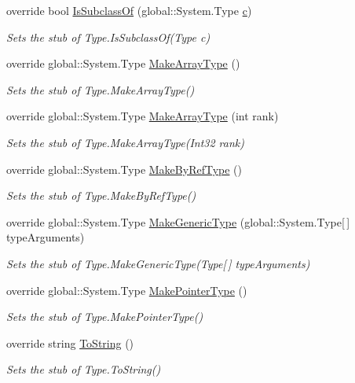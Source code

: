 \begin{DoxyCompactItemize}
override bool \hyperlink{class_system_1_1_reflection_1_1_fakes_1_1_stub_type_delegator_a7a22795f032bbaa2bbdfee06b1f17aa6}{Is\-Subclass\-Of} (global\-::\-System.\-Type \hyperlink{bootstrap_8min_8js_abce695e0af988ece0826d9ad59b8160d}{c})
\begin{DoxyCompactList}\small\item\em Sets the stub of Type.\-Is\-Subclass\-Of(\-Type c)\end{DoxyCompactList}\item 
override global\-::\-System.\-Type \hyperlink{class_system_1_1_reflection_1_1_fakes_1_1_stub_type_delegator_aba8b1e6b9ea0650dc8e8222f21b02478}{Make\-Array\-Type} ()
\begin{DoxyCompactList}\small\item\em Sets the stub of Type.\-Make\-Array\-Type()\end{DoxyCompactList}\item 
override global\-::\-System.\-Type \hyperlink{class_system_1_1_reflection_1_1_fakes_1_1_stub_type_delegator_aa86efbf5db657f629356f6bc2e96567c}{Make\-Array\-Type} (int rank)
\begin{DoxyCompactList}\small\item\em Sets the stub of Type.\-Make\-Array\-Type(\-Int32 rank)\end{DoxyCompactList}\item 
override global\-::\-System.\-Type \hyperlink{class_system_1_1_reflection_1_1_fakes_1_1_stub_type_delegator_a286399a690c3dbf263cd128af4d58e4b}{Make\-By\-Ref\-Type} ()
\begin{DoxyCompactList}\small\item\em Sets the stub of Type.\-Make\-By\-Ref\-Type()\end{DoxyCompactList}\item 
override global\-::\-System.\-Type \hyperlink{class_system_1_1_reflection_1_1_fakes_1_1_stub_type_delegator_aca07162c0076d7c872a6ce6efb581484}{Make\-Generic\-Type} (global\-::\-System.\-Type\mbox{[}$\,$\mbox{]} type\-Arguments)
\begin{DoxyCompactList}\small\item\em Sets the stub of Type.\-Make\-Generic\-Type(\-Type\mbox{[}$\,$\mbox{]} type\-Arguments)\end{DoxyCompactList}\item 
override global\-::\-System.\-Type \hyperlink{class_system_1_1_reflection_1_1_fakes_1_1_stub_type_delegator_a47f1c774930f9c5dfff53936da1b331c}{Make\-Pointer\-Type} ()
\begin{DoxyCompactList}\small\item\em Sets the stub of Type.\-Make\-Pointer\-Type()\end{DoxyCompactList}\item 
override string \hyperlink{class_system_1_1_reflection_1_1_fakes_1_1_stub_type_delegator_a9a93c31b68657359b9f0da84ecf386ee}{To\-String} ()
\begin{DoxyCompactList}\small\item\em Sets the stub of Type.\-To\-String()\end{DoxyCompactList}\end{DoxyCompactItemize}
